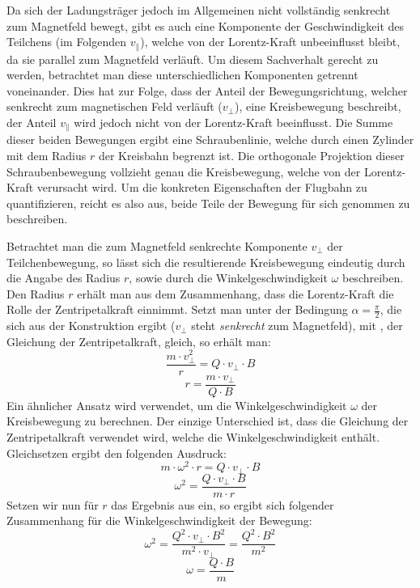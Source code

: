 Da sich der Ladungstr\"ager jedoch im Allgemeinen nicht vollst\"andig senkrecht zum Magnetfeld bewegt, gibt es auch eine Komponente
der Geschwindigkeit des Teilchens (im Folgenden \(v_\parallel\)), welche von der Lorentz-Kraft unbeeinflusst bleibt, da sie parallel zum
Magnetfeld verl\"auft.
Um diesem Sachverhalt gerecht zu werden, betrachtet man diese unterschiedlichen Komponenten getrennt voneinander. Dies hat zur
Folge, dass der Anteil der Bewegungsrichtung, welcher senkrecht zum magnetischen Feld verl\"auft (\(v_\perp\)), eine Kreisbewegung
beschreibt,
der Anteil \(v_\parallel\) wird jedoch nicht von der Lorentz-Kraft beeinflusst. 
Die Summe dieser beiden Bewegungen ergibt
eine Schraubenlinie, welche durch einen Zylinder mit dem Radius \(r\) der Kreisbahn begrenzt ist. Die orthogonale Projektion dieser
Schraubenbewegung vollzieht genau die Kreisbewegung, welche von der Lorentz-Kraft verursacht wird.
Um die konkreten Eigenschaften der Flugbahn zu quantifizieren, reicht es also aus, beide Teile der Bewegung f\"ur sich genommen
zu beschreiben. 

Betrachtet man die zum Magnetfeld senkrechte Komponente \(v_\perp\) der Teilchenbewegung, so l\"asst sich die resultierende Kreisbewegung
eindeutig durch die Angabe des Radius \(r\), sowie durch die Winkelgeschwindigkeit \(\omega\) beschreiben. Den Radius \(r\) erh\"alt
man aus dem Zusammenhang, dass die Lorentz-Kraft die Rolle der Zentripetalkraft einnimmt. Setzt man  unter der
Bedingung \(\alpha = \frac{\pi}{2}\), die sich aus der Konstruktion ergibt (\(v_\perp\) steht \textit{senkrecht} zum Magnetfeld),
mit , der Gleichung der Zentripetalkraft, gleich, so erh\"alt man:
\begin{equation*}
  \frac{m \cdot v_\perp^2}{r} = Q \cdot v_\perp \cdot B
\end{equation*}
\begin{equation}
  \label{eq:radius}
  r = \frac{m \cdot v_\perp}{Q \cdot B}
\end{equation}
Ein \"ahnlicher Ansatz wird verwendet, um die Winkelgeschwindigkeit \(\omega\) der Kreisbewegung zu berechnen. Der einzige Unterschied
ist, dass die Gleichung der Zentripetalkraft verwendet wird, welche die Winkelgeschwindigkeit enth\"alt. Gleichsetzen ergibt den
folgenden Ausdruck:
\begin{equation*}
  m \cdot \omega^2 \cdot r = Q \cdot v_\perp \cdot B
\end{equation*}
\begin{equation*}
  \omega^2 = \frac{Q \cdot v_\perp \cdot B}{m \cdot r}
\end{equation*}
Setzen wir nun f\"ur \(r\) das Ergebnis aus  ein, so ergibt sich folgender Zusammenhang f\"ur die
Winkelgeschwindigkeit der Bewegung:
\begin{equation*}
  \omega^2 = \frac{Q^2 \cdot v_\perp \cdot B^2}{m^2 \cdot v_\perp} = \frac{Q^2 \cdot B^2}{m^2}
\end{equation*}
\begin{equation}
  \label{eq:omega}
  \omega = \frac{Q \cdot B}{m}
\end{equation}


